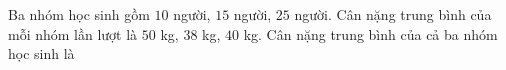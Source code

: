 \begin{ex}
Ba nhóm học sinh gồm $10$ người, $15$ người, $25$ người. Cân nặng trung bình của mỗi nhóm lần lượt là $50$ kg, $38$ kg, $40$ kg. Cân nặng trung bình của cả ba nhóm học sinh là
\end{ex}
